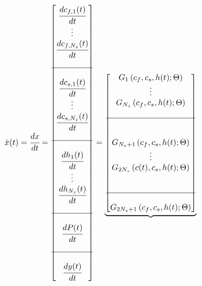 \documentclass[../Article_Model_Parameters.tex]{subfiles}
\begin{document}
				{\footnotesize
					\begin{align*} \label{discretization}
						\dot{{\color{black}x}}(t) &= \cfrac{d x}{d t} = 
						\begin{bmatrix}
							\cfrac{d {\color{black}c_{f,1}}(t)}{d t} 	  \\
							\vdots					  \\
							\cfrac{d {\color{black}c_{f,N_z}}(t)}{d t} \\
							\\ \hline \\
							\cfrac{d {\color{black}c_{s,1}}(t)}{d t} 	  \\
							\vdots					  \\
							\cfrac{d {\color{black}c_{s,N_z}}(t)}{d t} \\
							\\ \hline \\
							\cfrac{d {\color{black}h_1}(t)}{d t} 	  \\
							\vdots 					  \\
							\cfrac{d {\color{black}h_{N_z}}(t)}{d t} \\
							\\ \hline \\
							\cfrac{d {\color{black}P}(t)}{d t} \\
							\\ \hline \\
							\cfrac{d {\color{black}y}(t)}{d t}
						\end{bmatrix}
						=
						\underbrace{\begin{bmatrix}
								{\color{black}G_1} \left( c_f,c_s,{\color{black}h}(t); \Theta \right)\\ 
								\vdots\\ 
								{\color{black}G_{N_z}} \left( c_f,c_s,{\color{black}h}(t); \Theta \right)\\ 
								\\ \hline \\ \\
								{\color{black}G_{N_z+1}} \left( c_f,c_s,{\color{black}h}(t); \Theta \right)\\ 
								\vdots\\
								{\color{black}G_{2N_z}} \left( {\color{black}c}(t),c_s,{\color{black}h}(t); \Theta \right)\\ 
								\\ \\ \hline \\ 
								{\color{black}G_{2N_z+1}} \left( c_f,c_s,{\color{black}h}(t); \Theta \right) \\

\end{bmatrix}}
\end{align*}}
\end{document}
